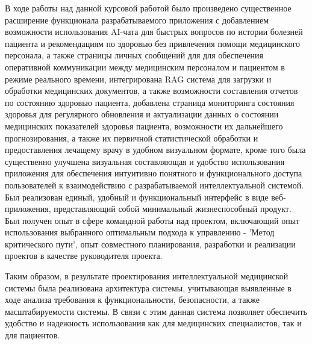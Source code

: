 
В ходе работы над данной курсовой работой было произведено существенное расширение  функционала разрабатываемого приложения с добавлением возможности использования AI-чата для быстрых вопросов по истории болезней пациента и рекомендациям по здоровью без привлечения помощи медицинского персонала, а также страницы личных сообщений для для обеспечения оперативной коммуникации между медицинским персоналом и пациентом в режиме реального времени, интегрирована RAG система для загрузки и обработки медицинских документов, а также возможности составления отчетов по состоянию здоровью пациента, добавлена страница мониторинга состояния здоровья для регулярного обновления и актуализации данных о состоянии медицинских показателей здоровья пациента, возможности их дальнейшего прогнозирования, а также их первичной статистической обработки и предоставления лечащему врачу в удобном визуальном формате, кроме того была  существенно улучшена визуальная составляющая и удобство использования приложения для обеспечения интуитивно понятного и функционального доступа пользователей к взаимодействию с разрабатываемой интеллектуальной системой. Был реализован единый, удобный и функциональный интерфейс в виде веб-приложения, представляющий собой минимальный жизнеспособный продукт. Был получен опыт в сфере командной работы над проектом, включающий опыт использования выбранного оптимальным подхода к управлению - 'Метод критического пути', опыт совместного планирования, разработки и реализации проектов в качестве руководителя проекта.

Таким образом, в результате проектирования интеллектуальной медицинской системы была реализована архитектура системы, учитывающая выявленные в ходе анализа требования к функциональности, безопасности, а также масштабируемости системы. В связи с этим данная система позволяет обеспечить удобство и надежность использования как для медицинских специалистов, так и для пациентов.
